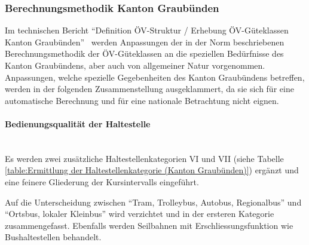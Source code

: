\subsubsection{Berechnungsmethodik Kanton Graubünden}
\label{Lösungsansätze:Berechnungsmethodik Kanton Graubünden}
Im technischen Bericht "`Definition \acs{ÖV}-Struktur / Erhebung  \gls{ÖV-Güteklassen} Kanton Graubünden"'~\cite{oev-guteklasse-gr} werden Anpassungen der in der Norm beschriebenen Berechnungsmethodik der \gls{ÖV-Güteklassen} an die speziellen Bedürfnisse des Kanton Graubündens, aber auch von allgemeiner Natur vorgenommen.
Anpassungen, welche spezielle Gegebenheiten des Kanton Graubündens betreffen, werden in der folgenden Zusammenstellung ausgeklammert, da sie sich für eine automatische Berechnung und für eine nationale Betrachtung nicht eignen.

\paragraph{Bedienungsqualität der Haltestelle}~\\
\label{Berechnungsmethodik Kanton Graubünden:Bedienungsqualität der Haltestelle}
Es werden zwei zusätzliche Haltestellenkategorien VI und VII (siehe Tabelle \ref{table:Ermittlung der Haltestellenkategorie (Kanton Graubünden)}) ergänzt und eine feinere Gliederung der Kursintervalls eingeführt.

Auf die Unterscheidung zwischen "`Tram, Trolleybus, Autobus, Regionalbus"' und "`Ortsbus, lokaler Kleinbus"' wird verzichtet und in der ersteren Kategorie zusammengefasst.
Ebenfalls werden Seilbahnen mit Erschliessungsfunktion wie Bushaltestellen behandelt.


